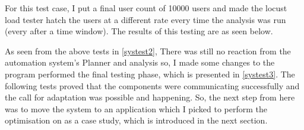 For this test case, I put a final user count of 10000 users  and made the locust load tester hatch the users at a different rate every time the analysis was run (every after a time window). The results of this testing are as seen below.
\begin{table}[H]
\caption{Test case 2 run on the application.}
\label{systest2}
\end{table}

As seen from the above tests in \autoref{systest2}, There was still no reaction from the automation system's Planner and analysis so, I made some changes to the program performed the final testing phase, which is presented in \autoref{systest3}. The following tests proved that the components were communicating successfully and the call for adaptation was possible and happening. So, the next step from here was to move the system to an application which I picked to perform the optimisation on as a case study, which is introduced in the next section.
\begin{table}[H]
\caption{Test case 3 run on the application.}
\label{systest3}
\end{table}

